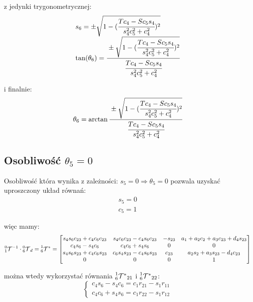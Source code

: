 \documentclass[]{article}
\newcommand\T{\mathcal{T}}
\begin{document}
z jedynki trygonometrycznej:
\begin{equation}\begin{array}{l}
s_6 = \pm \sqrt{1 - (\cfrac{Tc_4 - Sc_5s_4}{s_4^2c_5^2 + c_4^2})^2} \\
\tan(\theta_6) = \cfrac{\pm \sqrt{1 - (\cfrac{Tc_4 - Sc_5s_4}{s_4^2c_5^2 + c_4^2})^2}}{\cfrac{Tc_4 - Sc_5s_4}{s_4^2c_5^2 + c_4^2}}
\end{array}\end{equation}

i finalnie:
\begin{equation}
\theta_6 = \arctan\cfrac{\pm \sqrt{1 - (\cfrac{Tc_4 - Sc_5s_4}{s_4^2c_5^2 + c_4^2})^2}}{\cfrac{Tc_4 - Sc_5s_4}{s_4^2c_5^2 + c_4^2}}
\end{equation}

\subsection{Osobliwość $\theta_5 = 0$}
Osobliwość która wynika z zależności:  $s_5 = 0 \Rightarrow \theta_5 = 0$ pozwala uzyskać uproszczony układ równań:
\begin{equation}\begin{array}{l}
s_5 = 0 \\
c_5 = 1
\end{array}\end{equation}

więc mamy:
\begin{equation}\prescript{0}{1}{\T}^{-1} \cdot \prescript{0}{6}{\T}_d = \prescript{1}{6}{\T^*} = \begin{bmatrix}
s_4s_6c_{23} + c_4c_6c_{23} &
s_4c_6c_{23} - c_4s_6c_{23} &
- s_{23} &
a_1 + a_2c_2 + a_3c_{23} + d_4s_{23}
\\
c_4s_6 - s_4c_6 &
c_4c_6 + s_4s_6 &
0 &
0
\\
s_4s_6s_{23} + c_4c_6s_{23} &
c_6s_4s_{23} - c_4s_6s_{23} &
c_{23} &
a_2s_2 + a_3s_{23} - d_4c_{23}
\\
0 & 0 & 0 & 1
\end{bmatrix}\end{equation}

można wtedy wykorzystać równania $\prescript{1}{6}{\T^*}_{21}$ i $\prescript{1}{6}{\T^*}_{22}$:
\begin{equation}\left\{\begin{array}{l}
c_4s_6 - s_4c_6 = c_1r_{21} - s_1r_{11} \\
c_4c_6 + s_4s_6 = c_1r_{22} - s_1r_{12}
\end{array}\right.\end{equation}
\end{document}
